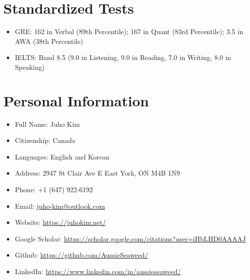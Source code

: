 \documentclass{article}
\begin{document}
	\section*{Standardized Tests}

	\begin{itemize}[noitemsep]
		\item GRE: 162 in Verbal (89th Percentile); 167 in Quant (83rd Percentile); 3.5 in AWA (38th Percentile)
		\item IELTS: Band 8.5 (9.0 in Listening, 9.0 in Reading, 7.0 in Writing, 8.0 in Speaking)
	\end{itemize}

	\section*{Personal Information}

	\begin{itemize}[noitemsep]
		\item Full Name: Juho Kim
		\item Citizenship: Canada
		\item Languages: English and Korean
		\item Address: 2947 St Clair Ave E East York, ON M4B 1N9
		\item Phone: +1 (647) 922-6192
		\item Email: \href{mailto:juho-kim@outlook.com}{juho-kim@outlook.com}
		\item Website: \url{https://juhokim.net/}
		\item Google Scholar: \url{https://scholar.google.com/citations?user=iHbLHD0AAAAJ}
		\item Github: \url{https://github.com/AussieSeaweed/}
		\item LinkedIn: \url{https://www.linkedin.com/in/aussieseaweed/}
		\iftoggle{verbose}{
			\item YouTube: \url{https://www.youtube.com/@AussieSeaweed}
		}{}
	\end{itemize}
\end{document}
